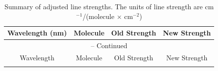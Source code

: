 \clearpage
\newpage
   \begin{longtable}{|cccc|}
      \caption{Summary of adjusted line strengths. The units of line
        strength are cm$^{-1}$/(molecule $\times$ cm$^{-2}$)} \\
        \hline
        Wavelength (nm) & Molecule & Old Strength & New Strength \\ \hline \hline
        \endfirsthead

        \multicolumn{4}{c}{{\tablename} \thetable{} -- Continued} \\
        \hline
        Wavelength & Molecule & Old Strength & New Strength \\ \hline \hline
        \endhead

        \hline
        \endfoot

        \hline
        \endlastfoot


\end{longtable}
